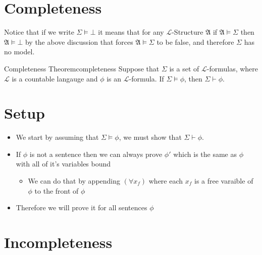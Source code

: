 \section{Completeness}












Notice that if we write $ \Sigma \models \bot $ it means that for any $\mathcal{L}$-Structure $ \mathfrak{ A }   $ if $ \mathfrak{ A } \models \Sigma   $ then $ \mathfrak{ A } \models \bot  $ by the above discussion that forces $ \mathfrak{ A } \models \Sigma   $ to be false, and therefore $ \Sigma  $ has no model.


\begin{theorem}{Completeness Theorem}{completeness}
Suppose that $\Sigma$ is a set of $\mathcal{L}$-formulas, where $ \mathcal{L}$ is a countable langauge  and $\phi$ is an $\mathcal{L}$-formula. If $\Sigma \models \phi$, then $\Sigma \vdash \phi$.

\section*{Setup}

\begin{itemize}
    \item We start by assuming that $ \Sigma \models \phi$, we must show that $ \Sigma \vdash \phi$.
    \item If $ \phi$ is not a sentence then we can always prove $ \phi'$ which is the same as $ \phi$ with all of it's variables bound
    \begin{itemize}
        \item We can do that by appending $ \left( \forall  x _{f}  \right)$ where each $ x_{f}$  is a free varaible of $ \phi$ to the front of $ \phi$ 
    \end{itemize}
\item Therefore we will prove it for all sentences $ \phi$ %
\end{itemize}

\end{theorem}


\section{Incompleteness}








